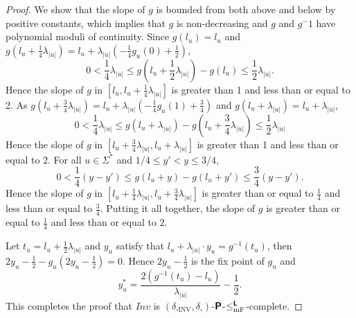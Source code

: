\documentclass[conference]{IEEEtran}
\newcommand{\classtwofont}[1]{\text{\bfseries \sffamily \upshape #1}}
\newcommand{\classLtwo}{\classtwofont{L}}
\newcommand{\classPtwo}{\classtwofont{P}}
\newcommand{\deltabox}{\delta _\square}
\newcommand{\deltaboxINV}{\delta _{\square \mathrm{INV}}}
\newcommand{\redmF}{\leq _{\mathrm{mF}}}
\newcommand{\redLmF}{\redmF ^{\classLtwo}}
\newcommand{\OpINV}{\mathit{Inv}}
\theoremstyle{definition}
\theoremstyle{remark}
\begin{document}
\begin{proof}
We show that the slope of $g$ is bounded from both above and below
by positive constants, which implies that $g$ is non-decreasing and 
$g$ and $g^-1$ have polynomial moduli of continuity.
Since $g(l_u)=l_u$ and 
$g(l_u+\frac{1}{4}\lambda_{|u|}) = l_u + \lambda_{|u|}(-\frac{1}{4}g_u(0) + \frac{1}{2})$,
\begin{equation}
 0 < \frac{1}{4}\lambda_{|u|}
 \le g \left( l_u+ \frac{1}{2} \lambda_{|u|} \right) - g(l_u)
 \le \frac{1}{2}\lambda_{|u|}.
\end{equation}
Hence the slope of $g$ in $[l_u, l_u + \frac{1}{4}\lambda_{|u|}]$ is 
greater than 1 and less than or equal to 2.
As $g(l_u+\frac{3}{4}\lambda_{|u|}) = l_u + \lambda_{|u|}(-\frac{1}{4}g_u(1) + \frac{3}{4})$ and
$g(l_u+\lambda_{|u|}) = l_u+\lambda_{|u|}$,
\begin{equation}
 0 < \frac{1}{4}\lambda_{|u|}
 \le g(l_u+\lambda_{|u|}) - g \left(l_u+ \frac 3 4 \lambda_{|u|} \right)
 \le \frac{1}{2}\lambda_{|u|}
\end{equation}
Hence the slope of $g$ in $[l_u + \frac{3}{4}\lambda_{|u|}, l_u + \lambda_{|u|}]$ is greater than 1 and less than or equal to 2.
For all $u \in \varSigma^*$ and $1/4 \le y' < y \le 3/4$,
\begin{equation}
0 < \frac{1}{4}(y - y') \le g(l_u+y) - g(l_u+y') \le \frac{3}{4}(y - y').
\end{equation}
Hence the slope of $g$ in $[l_u + \frac{1}{4}\lambda_{|u|}, l_u + \frac{3}{4}\lambda_{|u|}]$ 
is greater than or equal to $\frac{1}{4}$ and less than or equal to $\frac{3}{4}$.
Putting it all together, the slope of $g$ is greater than or equal to $\frac{1}{4}$ and less than or equal to $2$.

Let $t_u = l_u + \frac{1}{2}\lambda_{|u|}$ and $y_u$ satisfy that 
$l_u + \lambda_{|u|} \cdot y_u = g^{-1}(t_u)$, then
$2y_u - \frac{1}{2} - g_u (2y_u - \frac{1}{2}) = 0$.
Hence $2y_u - \frac{1}{2}$ is the fix point of $g_u$ and 
\begin{equation}
 y^*_u = \frac{2\left( g^{-1}(t_u) - l_u \right)}{\lambda_{|u|}} - \frac{1}{2}.
\end{equation}
This completes the proof that $\OpINV$ is $(\deltaboxINV, \deltabox)$-$\classPtwo$-$\redLmF$-complete.
\end{proof}
\end{document}
